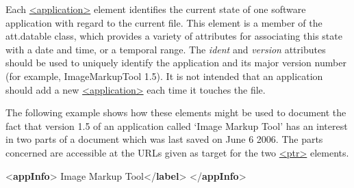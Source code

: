 Each \hyperref[TEI.application]{<application>} element identifies the current state of one software application with regard to the current file. This element is a member of the \textsf{att.datable} class, which provides a variety of attributes for associating this state with a date and time, or a temporal range. The {\itshape ident} and {\itshape version} attributes should be used to uniquely identify the application and its major version number (for example, ImageMarkupTool 1.5). It is not intended that an application should add a new \hyperref[TEI.application]{<application>} each time it touches the file.\par
The following example shows how these elements might be used to document the fact that version 1.5 of an application called ‘Image Markup Tool’ has an interest in two parts of a document which was last saved on June 6 2006. The parts concerned are accessible at the URLs given as target for the two \hyperref[TEI.ptr]{<ptr>} elements. \par\bgroup{}\exampleFont \begin{shaded}\noindent\mbox{}{<\textbf{appInfo}>}\mbox{}\newline 
{}\mbox{}\newline 
\hspace*{1em}Image Markup Tool{</\textbf{label}>}\mbox{}\newline 
\hspace*{1em}\mbox{}\newline 
\hspace*{1em}\mbox{}\newline 
{}\mbox{}\newline 
{</\textbf{appInfo}>}\end{shaded}\egroup\par 
